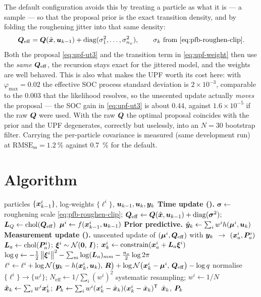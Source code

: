 The default configuration avoids this by treating a particle as what it is --- a sample --- so that
the proposal prior is the exact transition density, and by folding the roughening jitter into that
same density:
\begin{equation}
  \bm{Q}_{\mathrm{eff}} = \bm{Q}(\hat{\bm{x}},\bm{u}_{k-1}) + \operatorname{diag}(\sigma_1^2,\dots,\sigma_{n_x}^2),
  \qquad \sigma_k \text{ from } \eqref{eq:pfb-roughen-clip}.
  \label{eq:upf-qeff}
\end{equation}
Both the proposal \eqref{eq:upf-ut3} and the transition term in \eqref{eq:upf-weight} then use the
\emph{same} $\bm{Q}_{\mathrm{eff}}$, the recursion stays exact for the jittered model, and the weights
are well behaved.  This is also what makes the UPF worth its cost here: with
$\varphi_{\max} = 0.02$ the effective SOC process standard deviation is
$2\times10^{-3}$, comparable to the \num{0.003} that the likelihood resolves, so the unscented
update actually \emph{moves} the proposal --- the SOC gain in \eqref{eq:upf-ut3} is about
\num{0.44}, against $1.6\times10^{-5}$ if the raw $\bm{Q}$ were used.  With the raw $\bm{Q}$ the optimal
proposal coincides with the prior and the UPF degenerates, correctly but uselessly, into an
$N=30$ bootstrap filter.  Carrying the per-particle covariance is measured (same development run) at
$\mathrm{RMSE}_{\mathrm{ss}} = \SI{1.2}{\percent}$ against \SI{0.7}{\percent} for the default.

\section{Algorithm}
\begin{algorithm}[H]
\caption{UPF --- one sampling period}
\begin{algorithmic}[1]
\Require particles $\{\bm{x}_{k-1}^i\}$, log-weights $\{\ell^i\}$, $\bm{u}_{k-1},\bm{u}_k,\bm{y}_k$
\State \textbf{Time update ().}
\State $\bm\sigma \gets$ roughening scale \eqref{eq:pfb-roughen-clip}; \; $\bm{Q}_{\mathrm{eff}} \gets \bm{Q}(\hat{\bm{x}},\bm{u}_{k-1}) + \operatorname{diag}(\bm\sigma^2)$; \; $\bm{L}_Q \gets \operatorname{chol}(\bm{Q}_{\mathrm{eff}})$
 \State $\bm\mu^i \gets f(\bm{x}_{k-1}^i,\bm{u}_{k-1})$ \EndFor
\State \textbf{Prior predictive.} $\hat{\bm{y}}_k \gets \sum_i w^i h(\bm\mu^i,\bm{u}_k)$
\State \textbf{Measurement update ().}
  \State unscented update of $(\bm\mu^i,\bm{Q}_{\mathrm{eff}})$ with $\bm{y}_k$ $\to$ $(\bm{x}_a^i,\bm{P}_a^i)$ 
  \State $\bm{L}_a \gets \operatorname{chol}(\bm{P}_a^i)$; \; $\bm\xi^i \sim \mathcal{N}\!\left(\bm 0,\,\bm{I}\right)$; \; $\bm{x}_k^i \gets \operatorname{constrain}(\bm{x}_a^i + \bm{L}_a\bm\xi^i)$
  \State $\log q \gets -\tfrac12\left\lVert \bm\xi^i \right\rVert^2 - \sum_m \log(\bm{L}_a)_{mm} - \tfrac{n_x}{2}\log 2\pi$
  \State $\ell^i \gets \ell^i + \log\mathcal{N}\!\left(\bm{y}_k - h(\bm{x}_k^i,\bm{u}_k),\,\bm{R}\right) + \log\mathcal{N}\!\left(\bm{x}_k^i-\bm\mu^i,\,\bm{Q}_{\mathrm{eff}}\right) - \log q$
\EndFor
\State normalise $\{\ell^i\}\to\{w^i\}$; \; $N_{\mathrm{eff}}\gets 1/\sum_i (w^i)^2$
 \State systematic resampling; \; $w^i \gets 1/N$ \EndIf
\State $\hat{\bm{x}}_k \gets \sum_i w^i\bm{x}_k^i$; \; $\bm{P}_k \gets \sum_i w^i(\bm{x}_k^i-\hat{\bm{x}}_k)(\bm{x}_k^i-\hat{\bm{x}}_k)^{\mathsf{T}}$
\Ensure $\hat{\bm{x}}_k$, $\bm{P}_k$
\end{algorithmic}
\end{algorithm}

